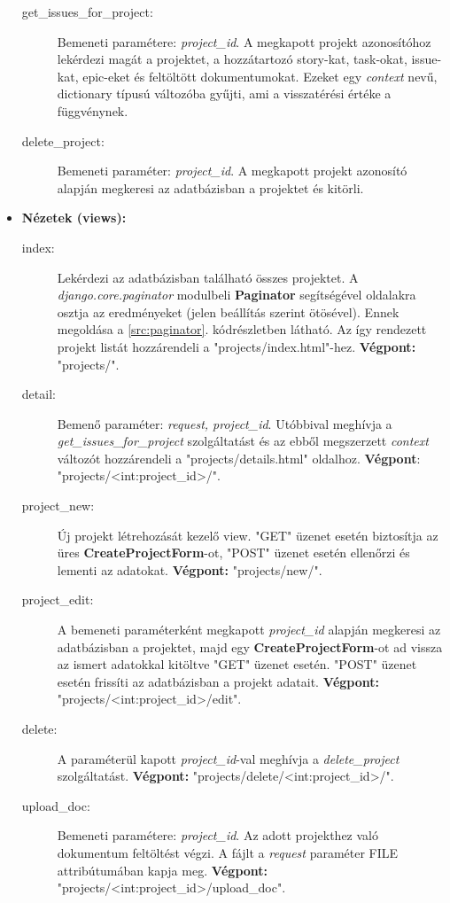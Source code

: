 \begin{itemize}
	\begin{description}
		\item[get\_issues\_for\_project:] Bemeneti paramétere: \textit{project\_id}. A megkapott projekt azonosítóhoz lekérdezi magát a projektet, a hozzátartozó story-kat, task-okat, issue-kat, epic-eket és feltöltött dokumentumokat. Ezeket egy \textit{context} nevű, dictionary típusú változóba gyűjti, ami a visszatérési értéke a függvénynek.
		\item[delete\_project:] Bemeneti paraméter: \textit{project\_id}. A megkapott projekt azonosító alapján megkeresi az adatbázisban a projektet és kitörli.
	\end{description}
	\item \textbf{Nézetek (views):}
	\begin{description}
		\item[index:] Lekérdezi az adatbázisban található összes projektet. A \textit{django.core.paginator} modulbeli \textbf{Paginator} segítségével oldalakra osztja az eredményeket (jelen beállítás szerint ötösével). Ennek megoldása a \ref{src:paginator}. kódrészletben látható. Az így rendezett projekt listát hozzárendeli a "projects/index.html"-hez. \textbf{Végpont:} "projects/".
		\item[detail:] Bemenő paraméter: \textit{request, project\_id}. Utóbbival meghívja a \textit{get\_issues\_for\_project} szolgáltatást és az ebből megszerzett \textit{context} változót hozzárendeli a "projects/details.html" oldalhoz. \textbf{Végpont}: "projects/<int:project\_id>/".
		\item[project\_new:] Új projekt létrehozását kezelő view. "GET" üzenet esetén biztosítja az üres \textbf{CreateProjectForm}-ot, "POST" üzenet esetén ellenőrzi és lementi az adatokat. \textbf{Végpont:} "projects/new/".
		\item[project\_edit:] A bemeneti paraméterként megkapott \textit{project\_id} alapján megkeresi az adatbázisban a projektet, majd egy \textbf{CreateProjectForm}-ot ad vissza az ismert adatokkal kitöltve "GET" üzenet esetén. "POST" üzenet esetén frissíti az adatbázisban a projekt adatait. \textbf{Végpont:} "projects/<int:project\_id>/edit".
		\item[delete:] A paraméterül kapott \textit{project\_id}-val meghívja a \textit{delete\_project} szolgáltatást. \textbf{Végpont:} "projects/delete/<int:project\_id>/".
		\item[upload\_doc:] Bemeneti paramétere: \textit{project\_id}. Az adott projekthez való dokumentum feltöltést végzi. A fájlt a \textit{request} paraméter FILE attribútumában kapja meg. \textbf{Végpont:} "projects/<int:project\_id>/upload\_doc".

\end{description}
\end{itemize}
